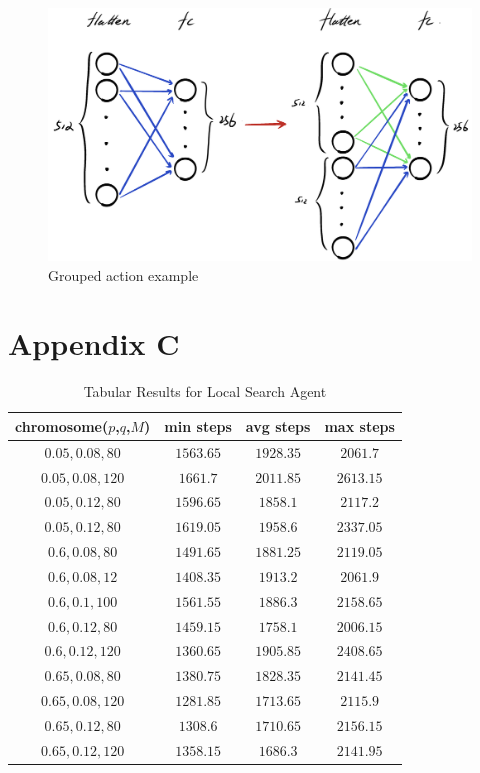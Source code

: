 \documentclass[letterpaper]{article} %
\begin{document}
  \begin{figure}[h!]
    \centering
    \includegraphics[width=0.75\linewidth]{figures/architecutre.jpeg}
    \caption{Grouped action example}
    \label{fig:training}
  \end{figure}
  
\newpage
\section{Appendix C}
\begin{table}[h!]
  \centering
  \normalsize{
    \begin{spacing}{1.9}
    \begin{tabular}{ |cccc| } 
      \hline
      chromosome($p$,$q$,$M$) & min steps & avg steps & max steps  \\ 
      \hline
      \hline
      $0.05, 0.08, 80$  & $1563.65$       & $1928.35$        & $2061.7$\\
      $0.05, 0.08, 120$ & $1661.7$        & $2011.85$        & $2613.15$\\
      $0.05, 0.12, 80$  & $1596.65$       & $1858.1$         & $2117.2$\\
      $0.05, 0.12, 80$  & $1619.05$       & $1958.6$         & $2337.05$\\
      $0.6, 0.08, 80$   & $1491.65$         & $1881.25$      & $2119.05$\\
      $0.6, 0.08, 12$   & $1408.35$         & $1913.2$       & $2061.9$\\
      $0.6, 0.1, 100$   & $1561.55$         & $1886.3$       & $2158.65$\\
      $0.6, 0.12, 80$   & $1459.15$         & $1758.1$       & $2006.15$\\
      $0.6, 0.12, 120$  & $1360.65$         & $1905.85$      & $2408.65$\\
      $0.65, 0.08, 80$  & $1380.75$         & $1828.35$      & $2141.45$\\
      $0.65, 0.08, 120$ & $1281.85$         & $1713.65$      & $2115.9$\\
      $0.65, 0.12, 80$  & $1308.6$         & $1710.65$       & $2156.15$\\
      $0.65, 0.12, 120$ & $1358.15$         & $1686.3$       & $2141.95$ \\ 
      \hline
    \end{tabular}
  \end{spacing}
  }
  \caption{Tabular Results for Local Search Agent}
  \label{tab:tabularResultGA}
\end{table}  
  \newpage
\end{document}
